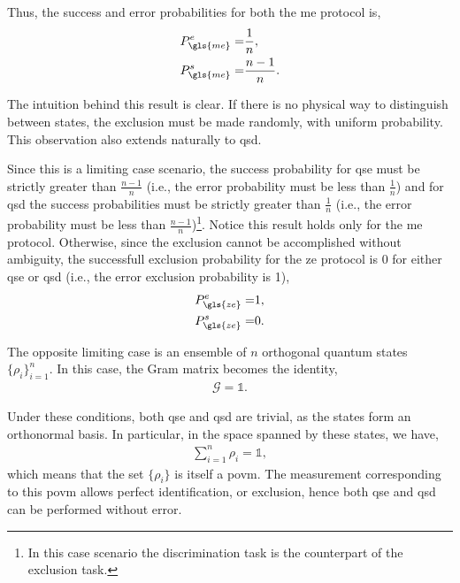 \documentclass[12pt,letterpaper]{article}
\begin{document}
Thus, the success and error probabilities for both the \gls{me} protocol is,
\begin{align*}
	P_{\gls{me}}^e =& \frac{1}{n},\\
	P_{\gls{me}}^s =& \frac{n-1}{n}.
\end{align*}

The intuition behind this result is clear. If there is no physical way to distinguish between states, the exclusion must be made randomly, with uniform probability. This observation also extends naturally to \gls{qsd}.

Since this is a limiting case scenario, the success probability for \gls{qse} must be strictly greater than $\frac{n-1}{n}$ (i.e., the error probability must be less than $\frac{1}{n}$) and for \gls{qsd} the success probabilities must be strictly greater than $\frac{1}{n}$ (i.e., the error probability must be less than $\frac{n-1}{n}$)\footnote{In this case scenario the discrimination task is the counterpart of the exclusion task.}. Notice this result holds only for the \gls{me} protocol. Otherwise, since the exclusion cannot be accomplished without ambiguity, the successfull exclusion probability for the \gls{ze} protocol is 0 for either \gls{qse} or \gls{qsd} (i.e., the error exclusion probability is 1), 
\begin{align*}
	P_{\gls{ze}}^e =& 1,\\
	P_{\gls{ze}}^s =& 0.
\end{align*}

The opposite limiting case is an ensemble of $n$ orthogonal quantum states $\{\rho_i\}_{i=1}^{n}$. In this case, the Gram matrix becomes the identity,
\begin{align*}
	\mathcal{G} = \mathds{1}.
\end{align*}

Under these conditions, both \gls{qse} and \gls{qsd} are trivial, as the states form an orthonormal basis. In particular, in the space spanned by these states, we have,
\begin{align*}
	\sum_{i=1}^{n} \rho_i = \mathds{1},
\end{align*}
which means that the set $\{\rho_i\}$ is itself a \gls{povm}. The measurement corresponding to this \gls{povm} allows perfect identification, or exclusion, hence both \gls{qse} and \gls{qsd} can be performed without error.
\end{document}
